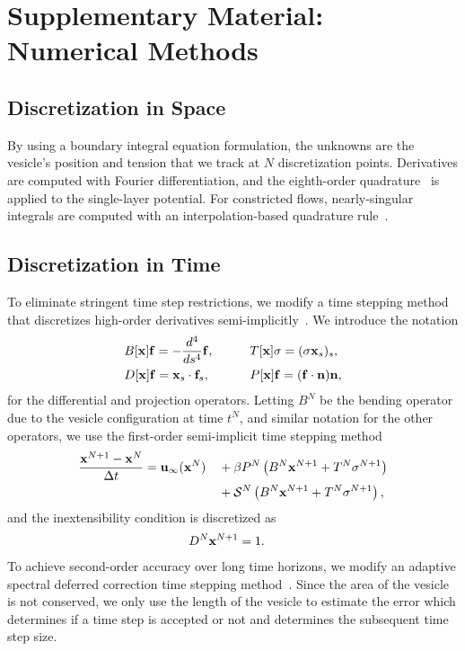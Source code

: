 \documentclass[9pt,twocolumn,twoside,lineno]{pnas-new}
\begin{document}
\section*{Supplementary Material: Numerical Methods}

\subsection*{Discretization in Space}
By using a boundary integral equation formulation, the unknowns are the
vesicle's position and tension that we track at $N$ discretization
points. Derivatives are computed with Fourier differentiation, and the
eighth-order quadrature~\cite{alp1999} is applied to the single-layer
potential. For constricted flows, nearly-singular integrals are computed
with an interpolation-based quadrature rule~\cite{qua-bir2014}.

\subsection*{Discretization in Time}
To eliminate stringent time step restrictions, we modify a time stepping
method that discretizes high-order derivatives
semi-implicitly~\cite{vee-gue-zor-bir2009}. We introduce the notation
\begin{alignat}{3}
  &B[\mathbf{x}]\mathbf{f} = -\frac{d^4}{ds^4} \mathbf{f},  \qquad
  &&T[\mathbf{x}]\sigma = (\sigma \mathbf{x}_s)_s, \\
  &D[\mathbf{x}]\mathbf{f} = \mathbf{x}_s \cdot \mathbf{f}_s, 
  &&P[\mathbf{x}]\mathbf{f} = (\mathbf{f} \cdot \mathbf{n}) \mathbf{n},
\end{alignat}
for the differential and projection operators. Letting $B^N$ be the
bending operator due to the vesicle configuration at time $t^N$, and
similar notation for the other operators, we use the first-order
semi-implicit time stepping method
\begin{alignat}{3}  
  \frac{\mathbf{x}^{N+1} - \mathbf{x}^N}{\Delta t} &= \mathbf{u}_\infty(\mathbf{x}^N) 
  &&+ \beta P^N\left(B^N\mathbf{x}^{N+1} + T^N\sigma^{N+1}\right) \nonumber \\
  & &&+ \mathcal{S}^N\left(B^N\mathbf{x}^{N+1} + T^N\sigma^{N+1}\right), 
\end{alignat}
and  the inextensibility condition is discretized as
\begin{align}
  D^N\mathbf{x}^{N+1} &= 1.
\end{align}
To achieve second-order accuracy over long time horizons, we modify an
adaptive spectral deferred correction time stepping
method~\cite{qua-bir2016}. Since the area of the vesicle is not
conserved, we only use the length of the vesicle to estimate the error
which determines if a time step is accepted or not and determines the
subsequent time step size.
\end{document}

